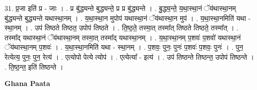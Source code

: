 \documentclass[17pt]{extarticle}
\begin{document}
31. प्र॒जा इति॑ प्र - जाः । . प्र बु॑द्ध्यन्ते बुद्ध्यन्ते॒ प्र प्र बु॑द्ध्यन्ते । . बु॒द्ध्य॒न्ते॒ य॒था॒स्था॒नं ॅय॑थास्था॒नम् बु॑द्ध्यन्ते बुद्ध्यन्ते यथास्था॒नम् । . य॒था॒स्था॒न मुपोप॑ यथास्था॒नं ॅय॑थास्था॒न मुप॑ । . य॒था॒स्था॒नमिति॑ यथा - स्था॒नम् । . उप॑ तिष्ठते तिष्ठत॒ उपोप॑ तिष्ठते । . ति॒ष्ठ॒ते॒ तस्मा॒त् तस्मा᳚त् तिष्ठते तिष्ठते॒ तस्मा᳚त् । . तस्मा᳚द् यथास्था॒नं ॅय॑थास्था॒नम् तस्मा॒त् तस्मा᳚द् यथास्था॒नम् । . य॒था॒स्था॒नम् प॒शवः॑ प॒शवो॑ यथास्था॒नं ॅय॑थास्था॒नम् प॒शवः॑ । . य॒था॒स्था॒नमिति॑ यथा - स्था॒नम् । . प॒शवः॒ पुनः॒ पुनः॑ प॒शवः॑ प॒शवः॒ पुनः॑ । . पुन॒ रेत्येत्य॒ पुनः॒ पुन॒ रेत्य॑ । . एत्योपो पेत्ये त्योप॑ । . एत्येत्या᳚ - इत्य॑ । . उप॑ तिष्ठन्ते तिष्ठन्त॒ उपोप॑ तिष्ठन्ते । . ति॒ष्ठ॒न्त॒ इति॑ तिष्ठन्ते । \newline

\textbf{Ghana Paata } \newline
\end{document}
